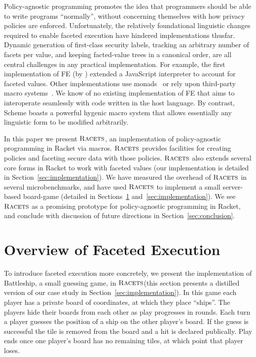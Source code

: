 \documentclass[review=true,acmlarge]{acmart}
\newcommand{\racets}[0]{$\textsc{Racets}$\xspace}
\begin{document}
Policy-agnostic programming promotes the idea that programmers should
be able to write programs ``normally'', without concerning themselves
with how privacy policies are enforced. Unfortunately, the
relatively foundational linguistic changes required to enable faceted
execution have hindered implementations thusfar. Dynamic generation
of first-class security labels, tracking an arbitrary number of
facets per value, and keeping facted-value trees in a canonical order,
are all central challenges in any practical implementation. For example, the
first implementation of FE (by \citet{Austin:2012}) extended
a JavaScript interpreter to account for faceted values. Other
implementations use monads~\cite{Schmitz:2016}
or rely upon third-party macro systems~\cite{Yang:2016}. We
know of no existing implementation of FE that aims to interoperate seamlessly
with code written in the host language. By contrast, Scheme boasts a powerful
hygenic macro system that allows essentially any linguistic form
to be modified arbitrarily.

In this paper we present \racets, an implementation of policy-agnostic
programming in Racket via macros. \racets provides facilities for
creating policies and faceting secure data with those policies. \racets
also extends several core forms in Racket to work with faceted
values (our implementation is detailed in Section~\ref{sec:implementation}). We
have measured the overhead of \racets in several microbenchmarks, and
have used \racets to implement a small server-based
board-game (detailed in Sections~\ref{sec:overview} and~\ref{sec:implementation}). We see \racets as a
promising prototype for policy-agnostic programming in Racket, and
conclude with discussion of future directions in Section~\ref{sec:conclusion}.

\section{Overview of Faceted Execution}
\label{sec:overview}

To introduce faceted execution more concretely, we present the implementation
of Battleship, a small guessing game, in \racets (this section presents a
distilled version of our case study in
Section~\ref{sec:implementation}). In this game each player has a
private board of coordinates, at which they place ``ships''. The players
hide their boards from each other as play progresses in rounds. Each
turn a player guesses the position of a ship on the other player's
board. If the guess is successful the tile is removed from the
board and a hit is declared publically. Play ends once one player's board
has no remaining tiles, at which point that player loses.
\end{document}

